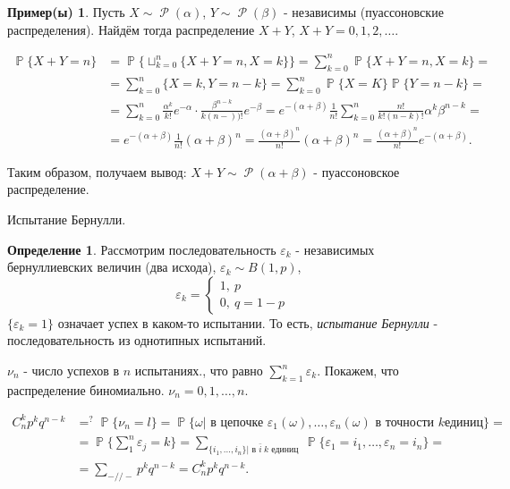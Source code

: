 \documentclass[a4paper,100pt]{article}
\theoremstyle{indented}
\theoremstyle{definition}
\newtheorem{defn}{Определение}
\newtheorem{exl}{Пример(ы)}
\theoremstyle{remark}
\DeclareMathOperator{\PP}{\mathbb{P}}
\DeclareMathOperator{\Rho}{\mathcal{P}}
\begin{document}
\begin{exl}
    Пусть $X\sim \Rho(\alpha)$, $Y\sim \Rho(\beta)$ - независимы (пуассоновские распределения). Найдём тогда распределение $X+Y$, $X+Y=0, 1, 2, \ldots$. 
   
    \begin{equation*}
        \begin{aligned}
            \PP\{X+Y=n\} & =\PP\{\sqcup_{k=0}^n\{X+Y=n, X=k\}\} =\sum_{k=0}^n\PP\{X+Y=n, X=k\}= \\ 
             & = \sum_{k=0}^n\{X=k, Y=n-k\} =\sum_{k=0}^n\PP\{X=K\}\PP\{Y=n-k\}= \\ 
             & = \sum_{k=0}^n\frac{\alpha^k}{k!}e^{-\alpha}\cdot \frac{\beta^{n-k}}{k(n-))!}e^{-\beta} = e^{-(\alpha+\beta)}\frac{1}{n!}\sum_{k=0}^n\frac{n!}{k!(n-k)!}\alpha^k\beta^{n-k}= \\ 
             & = e^{-(\alpha+\beta)}\frac{1}{n!}(\alpha+\beta)^n =\frac{(\alpha+\beta)^n}{n!}(\alpha+\beta)^n=\frac{(\alpha+\beta)^n}{n!}e^{-(\alpha+\beta)}. 
        \end{aligned}
    \end{equation*}
        

    Таким образом, получаем вывод: $X+Y\sim\Rho(\alpha+\beta)$ - пуассоновское распределение.
\end{exl}

Испытание Бернулли. 

\begin{defn}
    Рассмотрим последовательность $\varepsilon_k$ - независимых бернуллиевских величин (два исхода), $\varepsilon_k\sim B(1, p)$, 
    \begin{equation*}
        \varepsilon_k=
        \begin{cases}
            1, \: p \\ 
            0, \: q=1-p
        \end{cases}
    \end{equation*}
    $\{\varepsilon_k=1\}$ означает успех в каком-то испытании. То есть, \textit{испытание Бернулли} - последовательность из однотипных испытаний.
\end{defn}

$\nu_n$ - число успехов в $n$ испытаниях., что равно $\sum_{k=1}^n\varepsilon_k$. Покажем, что распределение биномиально. $\nu_n=0, 1, \ldots, n$.

\begin{equation*} 
    \begin{aligned}
        C_n^kp^kq^{n-k} & =^?\PP\{\nu_n=l\}=\PP\{\omega\vert \text{ в цепочке }\varepsilon_1(\omega), \ldots, \varepsilon_n(\omega)\text{ в точности } k \text{единиц}\}= \\ 
        & = \PP\{\sum_1^n\varepsilon_j=k\}=\sum_{\{i_1, \ldots, i_n\}| \text{ в } \bar{i} \: k \text{ единиц }}\PP\{\varepsilon_1= i_1, \ldots, \varepsilon_n=i_n\}= \\ 
        & = \sum_{-//-}p^kq^{n-k}=C_n^k p^kq^{n-k}.
    \end{aligned}
\end{equation*} 
\end{document}
